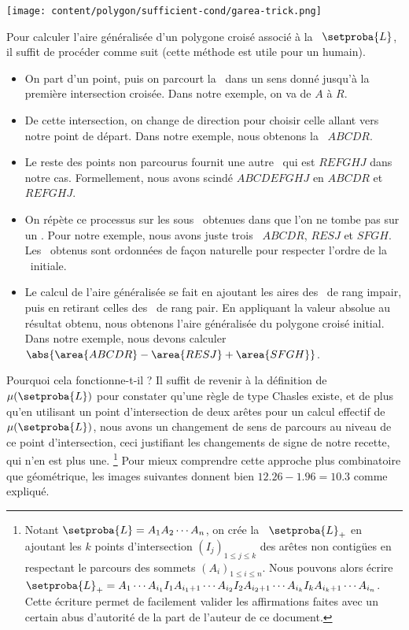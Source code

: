 \begin{center}
    \texttt{[image: content/polygon/sufficient-cond/garea-trick.png]}
\end{center}
	
	
Pour calculer l'aire généralisée d'un polygone croisé associé à la \nline\ $\setproba{L}$, il suffit de procéder comme suit (cette méthode est utile pour un humain).
%
\begin{itemize}
    \item On part d'un point, puis on parcourt la \nline\ dans un sens donné jusqu'à la première intersection croisée. Dans notre exemple, on va de $A$ à $R$.

    \item De cette intersection, on change de direction pour choisir celle allant vers notre point de départ. Dans notre exemple, nous obtenons la \nline\ $ABCDR$.

    \item Le reste des points non parcourus fournit une autre \nline\ qui est $REFGHJ$ dans notre cas. Formellement, nous avons scindé $ABCDEFGHJ$ en $ABCDR$ et $REFGHJ$.
    
    \item On répète ce processus sur les sous \nlines\ obtenues dans que l'on ne tombe pas sur un \ngone. Pour notre exemple, nous avons juste trois \ngones\ $ABCDR$, $RESJ$ et $SFGH$. Les \ngones\ obtenus sont ordonnées de façon naturelle pour respecter l'ordre de la \nline\ initiale.
    
    \item Le calcul de l'aire généralisée se fait en ajoutant les aires des \ngones\ de rang impair, puis en retirant celles des \ngones\ de rang pair. En appliquant la valeur absolue au résultat obtenu, nous obtenons l'aire généralisée du polygone croisé initial. Dans notre exemple, nous devons calculer $\abs{ \area{ABCDR} - \area{RESJ} + \area{SFGH} }$.
\end{itemize}

Pourquoi cela fonctionne-t-il ? Il suffit de revenir à la définition de $\mu(\setproba{L})$ pour constater qu'une règle de type Chasles existe, et de plus qu'en utilisant un point d'intersection de deux arêtes pour un calcul effectif de $\mu(\setproba{L})$, nous avons un changement de sens de parcours au niveau de ce point d'intersection, ceci justifiant les changements de signe de notre recette, qui n'en est plus une.%
\footnote{
	Notant $\setproba{L} = A_1 A_2 \cdots A_n$, on crée la \nline\ $\setproba{L}_{+}$ en ajoutant les $k$ points d'intersection $(I_j)_{1 \leq j \leq k}$ des arêtes non contigües en respectant le parcours des sommets $(A_i)_{1 \leq i \leq n}$.
	Nous pouvons alors écrire
	 $\setproba{L}_{+}
	= A_1 \cdots A_{i_1} I_1 
	  A_{i_1 + 1} \cdots A_{i_2} I_2
	  A_{i_2 + 1}
	  \cdots 
	  A_{i_k} I_k A_{i_k + 1} \cdots A_{i_n}$.
	Cette écriture permet de facilement valider les affirmations faites avec un certain abus d'autorité de la part de l'auteur de ce document.
}
Pour mieux comprendre cette approche plus combinatoire que géométrique, les images suivantes donnent bien $\num{12.26} - \num{1.96} = \num{10.3}$ comme expliqué.

